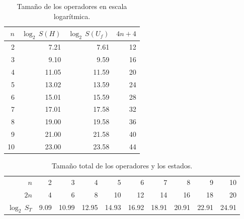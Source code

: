 \begin{ejemplo}
\begin{table}[h]
	\centering
	\begin{tabular}{*{4}{r}}
		\toprule
		$n$ & $\log_2 \, S(H)$ & $\log_2 \, S(U_f)$ & $4n+4$ \\
		\midrule
		2 	& 7.21	& 7.61	& 12\\
		3 	& 9.10	& 9.59	& 16\\
		4 	& 11.05	& 11.59	& 20\\
		5 	& 13.02	& 13.59	& 24\\
		6 	& 15.01	& 15.59	& 28\\
		7 	& 17.01	& 17.58	& 32\\
		8 	& 19.00	& 19.58	& 36\\
		9 	& 21.00	& 21.58	& 40\\
		10 	& 23.00	& 23.58	& 44\\
		\bottomrule
	\end{tabular}
	\caption{Tamaño de los operadores en escala logarítmica.}
\end{table}



\begin{table}[h]
	\centering
	\begin{tabular}{*{10}{r}}
		\toprule
$n$ & 2	& 3	& 4	& 5	& 6	& 7	& 8	& 9	& 10 \\
$2n$& 4	& 6	& 8	& 10	& 12	& 14	& 16	& 18	& 20 \\
$\log_2 \, S_T$ & 9.09	& 10.99	& 12.95	& 14.93	& 16.92	& 18.91	& 20.91	& 22.91	
& 24.91 \\
		\bottomrule
	\end{tabular}
	\caption{Tamaño total de los operadores y los estados.}
\end{table}


\end{ejemplo}
